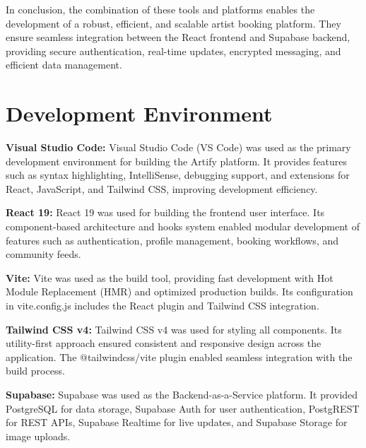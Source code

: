 \documentclass[12pt,a4paper]{report}
\begin{document}
\vspace{0.4cm}

In conclusion, the combination of these tools and platforms enables the development of a robust, efficient, and scalable artist booking platform. They ensure seamless integration between the React frontend and Supabase backend, providing secure authentication, real-time updates, encrypted messaging, and efficient data management.

\section{Development Environment}

\textbf{Visual Studio Code:}
Visual Studio Code (VS Code) was used as the primary development environment for building the Artify platform. It provides features such as syntax highlighting, IntelliSense, debugging support, and extensions for React, JavaScript, and Tailwind CSS, improving development efficiency.

\vspace{0.4cm}

\textbf{React 19:}
React 19 was used for building the frontend user interface. Its component-based architecture and hooks system enabled modular development of features such as authentication, profile management, booking workflows, and community feeds.

\vspace{0.4cm}

\textbf{Vite:}
Vite was used as the build tool, providing fast development with Hot Module Replacement (HMR) and optimized production builds. Its configuration in vite.config.js includes the React plugin and Tailwind CSS integration.

\vspace{0.4cm}

\textbf{Tailwind CSS v4:}
Tailwind CSS v4 was used for styling all components. Its utility-first approach ensured consistent and responsive design across the application. The @tailwindcss/vite plugin enabled seamless integration with the build process.

\vspace{0.4cm}

\textbf{Supabase:}
Supabase was used as the Backend-as-a-Service platform. It provided PostgreSQL for data storage, Supabase Auth for user authentication, PostgREST for REST APIs, Supabase Realtime for live updates, and Supabase Storage for image uploads.
\end{document}
